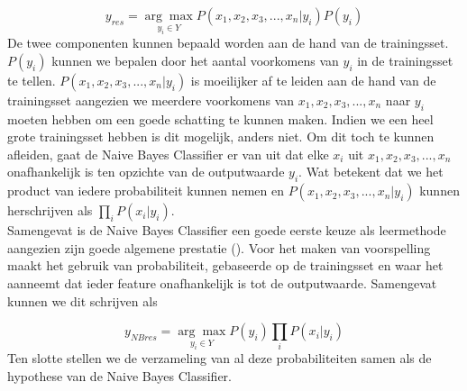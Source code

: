  \[ y_{res} = \underset{y_i \in Y}{\arg\max}P(x_{1},x_{2},x_{3},...,x_{n}|y_i)P(y_i) \]
%
 De twee componenten kunnen bepaald worden aan de hand van de trainingsset. $P(y_i)$ kunnen we bepalen door het aantal voorkomens van $y_i$ in de trainingsset te tellen. $P(x_{1},x_{2},x_{3},...,x_{n}|y_i)$ is moeilijker af te leiden aan de hand van de trainingsset aangezien we meerdere voorkomens van $x_{1},x_{2},x_{3},...,x_{n}$ naar $y_i$ moeten hebben om een goede schatting te kunnen maken.  Indien we een heel grote trainingsset hebben is dit mogelijk, anders niet. Om dit toch te kunnen afleiden, gaat de Naive Bayes Classifier er van uit dat elke $x_i$ uit $x_{1},x_{2},x_{3},...,x_{n}$ onafhankelijk is ten opzichte van de outputwaarde $y_i$. Wat betekent dat we het product van iedere probabiliteit kunnen nemen en $P(x_{1},x_{2},x_{3},...,x_{n}|y_i)$  kunnen herschrijven als $\prod\limits_{i} P(x_{i}|y_{i})$.\\
%
Samengevat is de Naive Bayes Classifier een goede eerste keuze als leermethode aangezien zijn goede algemene prestatie (\cite{Michie94machinelearning}). Voor het maken van voorspelling maakt het gebruik van probabiliteit, gebaseerde op de trainingsset en waar het aanneemt dat ieder feature onafhankelijk is tot de outputwaarde. Samengevat kunnen we dit schrijven als

 \[y_{NBres} = \underset{y_i \in Y}{\arg\max} P(y_{i})\prod\limits_{i} P(x_{i}|y_{i}) \]
%
Ten slotte stellen we de verzameling van al deze probabiliteiten samen als de hypothese van de Naive Bayes Classifier.

